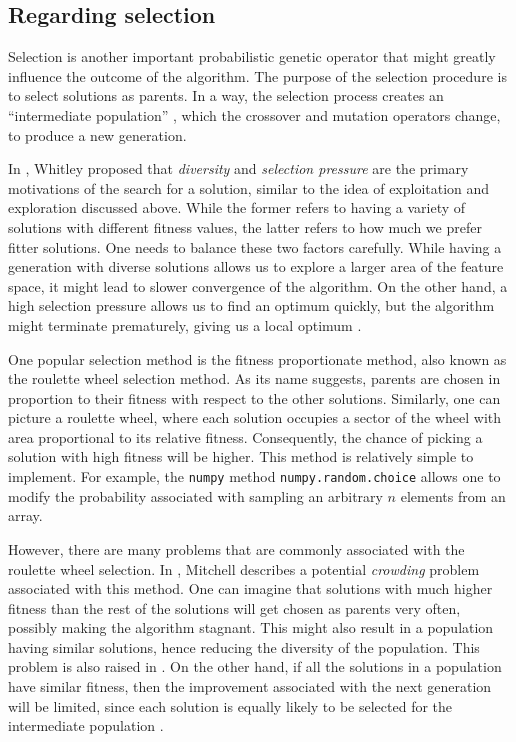 \documentclass[12pt, twoside, a4paper]{report}
\begin{document}
\subsection{Regarding selection} \label{bg:ga:selection}
Selection is another important probabilistic genetic operator that might greatly influence the outcome of the algorithm. The purpose of the selection procedure is to select solutions as parents. In a way, the selection process creates an ``intermediate population'' \cite{RefWorks:240}, which the crossover and mutation operators change, to produce a new generation.

In \cite{RefWorks:241}, Whitley proposed that \textit{diversity} and \textit{selection pressure} are the primary motivations of the search for a solution, similar to the idea of exploitation and exploration discussed above. While the former refers to having a variety of solutions with different fitness values, the latter refers to how much we prefer fitter solutions. One needs to balance these two factors carefully. While having a generation with diverse solutions allows us to explore a larger area of the feature space, it might lead to slower convergence of the algorithm. On the other hand, a high selection pressure allows us to find an optimum quickly, but the algorithm might terminate prematurely, giving us a local optimum \cite{RefWorks:242}.


One popular selection method is the fitness proportionate method, also known as the roulette wheel selection method. As its name suggests, parents are chosen in proportion to their fitness with respect to the other solutions. Similarly, one can picture a roulette wheel, where each solution occupies a sector of the wheel with area proportional to its relative fitness. Consequently, the chance of picking a solution with high fitness will be higher. This method is relatively simple to implement. For example, the \texttt{numpy} \cite{RefWorks:214} method \texttt{numpy.random.choice} allows one to modify the probability associated with sampling an arbitrary $n$ elements from an array. 

However, there are many problems that are commonly associated with the roulette wheel selection. In \cite{RefWorks:205}, Mitchell describes a potential \textit{crowding} problem associated with this method. One can imagine that solutions with much higher fitness than the rest of the solutions will get chosen as parents very often, possibly making the algorithm stagnant. This might also result in a population having similar solutions, hence reducing the diversity of the population. This problem is also raised in \cite{RefWorks:239}. On the other hand, if all the solutions in a population have similar fitness, then the improvement associated with the next generation will be limited, since each solution is equally likely to be selected for the intermediate population \cite{RefWorks:245}.
\end{document}
